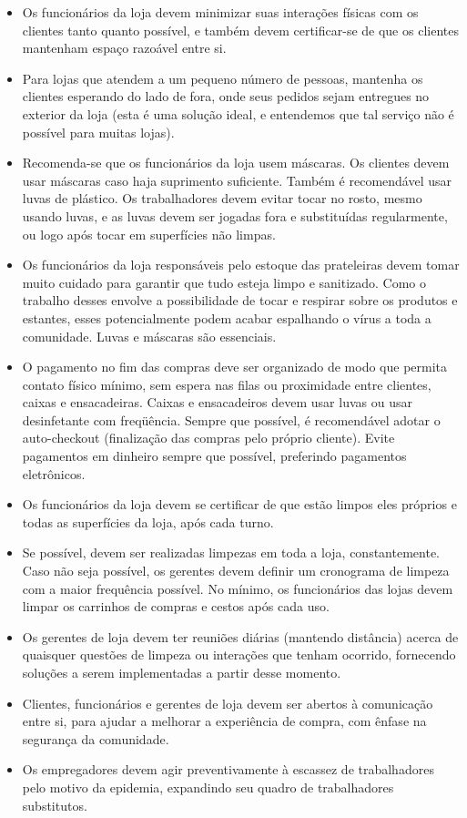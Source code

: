 \documentclass[onecolumn,journal]{IEEEtran}
\begin{document}
\begin{multicols}{2}
\begin{itemize}
\item Os funcionários da loja devem minimizar suas interações físicas com os clientes tanto quanto possível, e também devem certificar-se de que os clientes mantenham espaço razoável entre si.
\item Para lojas que atendem a um pequeno número de pessoas, mantenha os clientes esperando do lado de fora, onde seus pedidos sejam entregues no exterior da loja (esta é uma solução ideal, e entendemos que tal serviço não é possível para muitas lojas).
\item Recomenda-se que os funcionários da loja usem máscaras. Os clientes devem usar máscaras caso haja suprimento suficiente. Também é recomendável usar luvas de plástico. Os trabalhadores devem evitar tocar no rosto, mesmo usando luvas, e as luvas devem ser jogadas fora e substituídas regularmente, ou logo após tocar em superfícies não limpas.
\item Os funcionários da loja responsáveis pelo estoque das prateleiras devem tomar muito cuidado para garantir que tudo esteja limpo e sanitizado. Como o trabalho desses envolve a possibilidade de tocar e respirar sobre os produtos e estantes, esses potencialmente podem acabar espalhando o vírus a toda a comunidade. Luvas e máscaras são essenciais.
\item O pagamento no fim das compras deve ser organizado de modo que permita contato físico mínimo, sem espera nas filas ou proximidade entre clientes, caixas e ensacadeiras. Caixas e ensacadeiros devem usar luvas ou usar desinfetante com freqüência. Sempre que possível, é recomendável adotar o auto-checkout (finalização das compras pelo próprio cliente). Evite pagamentos em dinheiro sempre que possível, preferindo pagamentos eletrônicos.
\item Os funcionários da loja devem se certificar de que estão limpos eles próprios e todas as superfícies da loja, após cada turno.
\item Se possível, devem ser realizadas limpezas em toda a loja, constantemente. Caso não seja possível, os gerentes devem definir um cronograma de limpeza com a maior frequência possível. No mínimo, os funcionários das lojas devem limpar os carrinhos de compras e cestos após cada uso.
\item Os gerentes de loja devem ter reuniões diárias (mantendo distância) acerca de quaisquer questões de limpeza ou interações que tenham ocorrido, fornecendo soluções a serem implementadas a partir desse momento.
\item Clientes, funcionários e gerentes de loja devem ser abertos à comunicação entre si, para ajudar a melhorar a experiência de compra, com ênfase na segurança da comunidade.
\item Os empregadores devem agir preventivamente à escassez de trabalhadores pelo motivo da epidemia, expandindo seu quadro de trabalhadores substitutos.
\end{itemize}

\end{multicols}

\vspace{2ex}

% 

\end{document}
